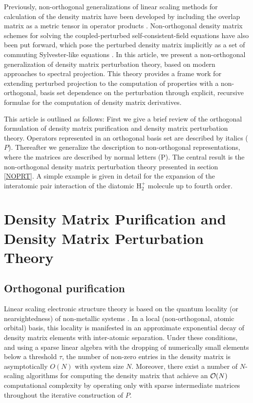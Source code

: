 \documentclass[twocolumn,showpacs,preprintnumbers,amsmath,amssymb]{revtex4}
\begin{document}
Previously, non-orthogonal generalizations of linear scaling methods for calculation of the 
density matrix have been developed by including the overlap matrix as a metric tensor in operator products 
\cite{APalser98,RNunes94,CWhite97}.  Non-orthogonal density matrix schemes for solving the 
coupled-perturbed self-consistent-field equations \cite{COchsenfeld97,HLarsen01,COchsenfeld04} 
have also been put forward, which pose the perturbed density matrix implicitly as a set of 
commuting Sylvester-like equations \cite{JBrandts01}.  In this article,  we present a non-orthogonal 
generalization of density matrix perturbation theory, based on modern approaches to spectral projection.  
This theory provides a frame work for extending perturbed projection to the computation
of properties with a non-orthogonal, basis set dependence on the perturbation through explicit, 
recursive formulae for the computation of density matrix derivatives.

This article is outlined as follows: First we give a brief review of the orthogonal 
formulation of density matrix purification and density matrix perturbation theory. 
Operators represented in an orthogonal basis set are described by italics ($P$). 
Thereafter we generalize the description to non-orthogonal representations, where 
the matrices are described by normal letters (P). The central result is the non-orthogonal
density matrix perturbation theory presented in section \ref{NOPRT}.
A simple example is given in detail for the expansion of the interatomic pair 
interaction of the diatomic H$_2^+$ molecule up to fourth order.

 
\section{Density Matrix Purification and Density Matrix Perturbation Theory}

\subsection{Orthogonal purification}

Linear scaling electronic structure theory is based on the quantum locality (or nearsightedness) of 
non-metallic systems \cite{WKohn96,WKohn59,RBaer97}.
In a local (non-orthogonal, atomic orbital) basis, this locality is manifested in an approximate 
exponential decay of density matrix elements with inter-atomic separation.  Under these 
conditions, and using a sparse linear algebra with the dropping of numerically small elements 
below a threshold $\tau$, the number of non-zero entries in the density matrix is asymptotically
$O(N)$ with system size $N$.  Moreover, there exist a number of $N$-scaling algorithms for 
computing the density matrix that achieve an ${\cal O}(N)$ computational complexity by operating
only with sparse intermediate matrices throughout the iterative construction of $P$.
\end{document}
